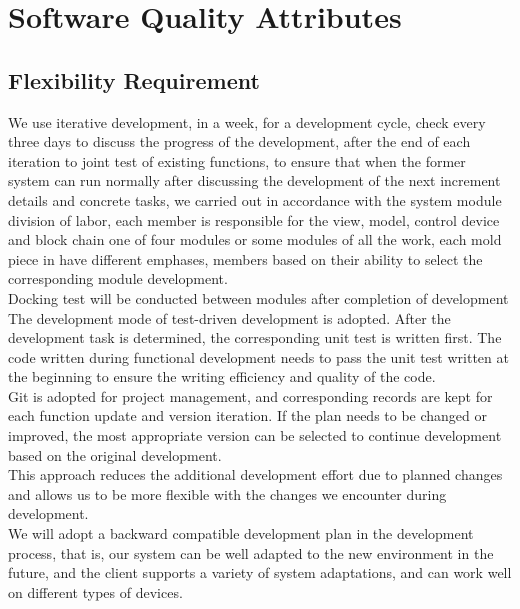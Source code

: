 \documentclass[16pt]{scrreprt}
\begin{document}
\section{Software Quality Attributes}
\subsection{Flexibility Requirement}
We use iterative development, in a week, for a development cycle, check every three days to discuss the progress of the development, after the end of each iteration to joint test of existing functions, to ensure that when the former system can run normally after discussing the development of the next increment details and concrete tasks, we carried out in accordance with the system module division of labor, each member is responsible for the view, model, control device and block chain one of four modules or some modules of all the work, each mold piece in have different emphases, members based on their ability to select the corresponding module development.\\

Docking test will be conducted between modules after completion of development\\

The development mode of test-driven development is adopted. After the development task is determined, the corresponding unit test is written first. The code written during functional development needs to pass the unit test written at the beginning to ensure the writing efficiency and quality of the code.\\

Git is adopted for project management, and corresponding records are kept for each function update and version iteration. If the plan needs to be changed or improved, the most appropriate version can be selected to continue development based on the original development.\\

This approach reduces the additional development effort due to planned changes and allows us to be more flexible with the changes we encounter during development.\\

We will adopt a backward compatible development plan in the development process, that is, our system can be well adapted to the new environment in the future, and the client supports a variety of system adaptations, and can work well on different types of devices.\\
\end{document}
